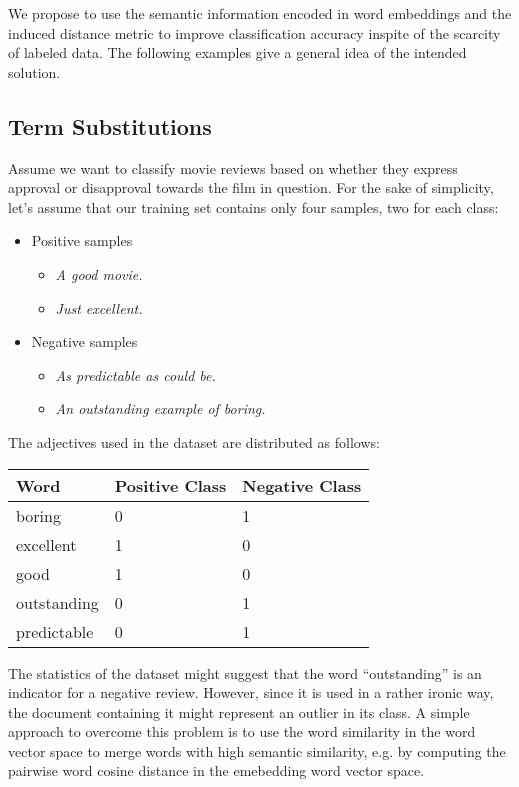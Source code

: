We propose to use the semantic information encoded in word embeddings and the
induced distance metric to improve classification accuracy inspite of the scarcity of labeled
data. The following examples give a general idea of the intended solution.

\subsection{Term Substitutions}
Assume we want to classify movie reviews based on whether they
express approval or disapproval towards the film in question. For the sake of
simplicity, let's assume that our training set contains only four samples, two
for each class:

\begin{itemize}
  \item Positive samples
  \begin{itemize}
	  \item \emph{A good movie.}
	  \item \emph{Just excellent.}
  \end{itemize}
  
  \item Negative samples
  \begin{itemize}
	  \item \emph{As predictable as could be.}
	  \item \emph{An outstanding example of boring.} 
  \end{itemize}
\end{itemize}

The adjectives used in the dataset are distributed as follows:

\begin{center}
\begin{tabular}{l|l|l}
\textbf{Word} & \textbf{Positive Class} & \textbf{Negative Class}  \\
\hline
boring & 0 & 1 \\
excellent & 1 & 0 \\
good & 1 & 0 \\
outstanding & 0 & 1 \\
predictable & 0 & 1 \\

\end{tabular}
\end{center}

The statistics of the dataset might suggest that the word ``outstanding'' is an
indicator for a negative review. However, since it is used in a rather ironic
way, the document containing it might represent an outlier in its class. A
simple approach to overcome this problem is to use the word similarity
in the word vector space to merge words with high semantic similarity, e.g. by
computing the pairwise word cosine distance in the emebedding word vector space.

